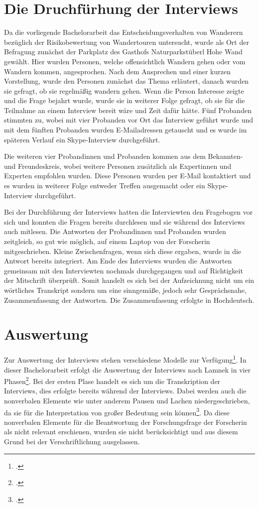 \section{Die Druchfürhung der Interviews}

Da die vorliegende Bachelorarbeit das Entscheidungsverhalten von Wanderern bezüglich der Risikobewertung von Wandertouren untersucht, wurde als Ort der Befragung zunächst der Parkplatz des Gasthofs Naturparkstüberl Hohe Wand gewählt. Hier wurden Personen, welche offensichtlich Wandern gehen oder vom Wandern kommen, angesprochen.
Nach dem Ansprechen und einer kurzen Vorstellung, wurde den Personen zunächst das Thema erläutert, danach wurden sie gefragt, ob sie regelmäßig wandern gehen. Wenn die Person Interesse zeigte und die Frage bejahrt wurde, wurde sie in weiterer Folge gefragt, ob sie für die Teilnahme an einem Interview bereit wäre und Zeit dafür hätte. Fünf Probanden stimmten zu, wobei mit vier Probanden vor Ort das Interview geführt wurde und mit dem fünften Probanden wurden E-Mailadressen getauscht und es wurde im späteren Verlauf ein Skype-Interview durchgeführt.

Die weiteren vier Probandinnen und Probanden kommen aus dem Bekannten- und Freundeskreis, wobei weitere Personen zusätzlich als Expertinnen und Experten empfohlen wurden. Diese Personen wurden per E-Mail kontaktiert und es wurden in weiterer Folge entweder Treffen ausgemacht oder ein Skype-Interview durchgeführt.

Bei der Durchführung der Interviews hatten die Interviewten den Fragebogen vor sich und konnten die Fragen bereits durchlesen und sie während des Interviews auch mitlesen. Die Antworten der Probandinnen und Probanden wurden zeitgleich, so gut wie möglich, auf einem Laptop von der Forscherin mitgeschrieben. Kleine Zwischenfragen, wenn sich diese ergaben, wurde in die Antwort bereits integriert. Am Ende des Interviews wurden die Antworten gemeinsam mit den Interviewten nochmals durchgegangen und auf Richtigkeit der Mitschrift überprüft.
Somit handelt es sich bei der Aufzeichnung nicht um ein wörtliches Transkript sondern um eine sinngemäße, jedoch sehr Gesprächsnahe, Zusammenfassung der Antworten. Die Zusammenfassung erfolgte in Hochdeutsch.

\section{Auswertung}

Zur Auswertung der Interviews stehen verschiedene Modelle zur Verfügung\footcite[S. 47]{mayer}. In dieser Bachelorarbeit erfolgt die Auswertung der Interviews nach Lamnek in vier Phasen\footcite[S. 367]{lamnek}. Bei der ersten Plase handelt es sich um die Transkription der Interviews, dies erfolgte bereits während der Interviews. Dabei werden auch die nonverbalen Elemente wie unter anderem Pausen und Lachen niedergeschrieben, da sie für die Interpretation von großer Bedeutung sein können\footcite[S. 367]{lamnek}. Da diese nonverbalen Elemente für die Beantwortung der Forschungsfrage der Forscherin als nicht relevant erschienen, wurden sie nicht berücksichtigt und aus diesem Grund bei der Verschriftlichung ausgelassen.

